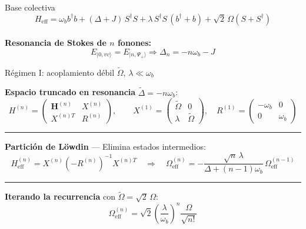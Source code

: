 \documentclass[
11pt,notheorems,hyperref={pdfauthor=whatever}
]{beamer}
\begin{document}
\begin{frame}{Base colectiva}
	{\small
		\begin{equation*}
			\boxed{
				H_{\mathrm{eff}} = \omega_b b^\dagger b
				+ (\Delta+J)\,S^\dagger S
				+ \lambda\,S^\dagger S\,(b^\dagger+b)
				+ \sqrt{2}\,\Omega\left(S+S^\dagger\right)
			}
		\end{equation*}
	}\\
	
	
	\vspace{6pt}
	{\small
		\textbf{Resonancia de Stokes de $n$ fonones:}
		\begin{equation*}
			E_{|0,vv\rangle} = E_{|n,\Psi_+\rangle} \Rightarrow \Delta_n = -n\omega_b - J
		\end{equation*}
	}
	
\end{frame}

\begin{frame}{Régimen I: acoplamiento débil \texorpdfstring{$\widetilde{\Omega},\,\lambda \ll \omega_b$}{}}
	
	\textbf{Espacio truncado en resonancia} $\widetilde{\Delta} = -n\omega_b$:
	\begin{equation*}
		H^{(n)} = \begin{pmatrix}
			\mathbf{H}^{(n)} & X^{(n)} \\[4pt]
			X^{(n)T} & R^{(n)}
		\end{pmatrix},
		\qquad
		X^{(1)} = \begin{pmatrix}
			\widetilde\Omega & 0 \\ \lambda & \widetilde\Omega
		\end{pmatrix},
		\quad
		R^{(1)} = \begin{pmatrix}
			-\omega_b & 0 \\ 0 & \omega_b
		\end{pmatrix}
	\end{equation*}
	
	\vspace{4pt}
	\rule{\textwidth}{0.4pt}
	\vspace{2pt}
	
	\textbf{Partición de Löwdin} — Elimina estados intermedios:
	\begin{equation*}
		H_\mathrm{eff}^{(n)} = X^{(n)}\!\left(-R^{(n)}\right)^{-1}\!X^{(n)T}
		\quad\Rightarrow\quad
		\Omega_\mathrm{eff}^{(n)}
		= -\frac{\sqrt{n}\,\lambda}{\Delta+(n-1)\omega_b}\,\Omega_\mathrm{eff}^{(n-1)}
	\end{equation*}
	
	\vspace{4pt}
	\rule{\textwidth}{0.4pt}
	\vspace{2pt}
	
	\textbf{Iterando la recurrencia} con $\widetilde\Omega = \sqrt{2}\,\Omega$:
	\begin{equation*}
		\boxed{
			\Omega_\mathrm{eff}^{(n)}
			= \sqrt{2}\left(\frac{\lambda}{\omega_b}\right)^{\!n}
			\frac{\Omega}{\sqrt{n!}}
		}
	\end{equation*}
	
\end{frame}
\end{document}
